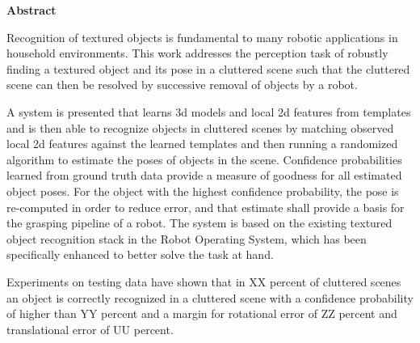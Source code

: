 

\clearemptydoublepage
{}
{}	





\vspace*{2cm}
\begin{center}
{\Large \bf Abstract}
\end{center}
\vspace{1cm}

Recognition of textured objects is fundamental to many robotic applications in
household environments. This work addresses the perception task of robustly
finding a textured object and its pose in a cluttered scene such that the
cluttered scene can then be resolved by successive removal of objects by a
robot.

A system is presented that learns 3d models and local 2d features from
templates and is then able to recognize objects in cluttered scenes by matching
observed local 2d features against the learned templates and then running a
randomized algorithm to estimate the poses of objects in the scene. Confidence
probabilities learned from ground truth data provide a measure of goodness for
all estimated object poses. For the object with the highest confidence
probability, the pose is re-computed in order to reduce error, and that
estimate shall provide a basis for the grasping pipeline of a robot. The system
is based on the existing textured object recognition stack in the Robot
Operating System, which has been specifically enhanced to better solve the task
at hand.

Experiments on testing data have shown that in XX percent of cluttered scenes
an object is correctly recognized in a cluttered scene with a confidence
probability of higher than YY percent and a margin for rotational error of ZZ
percent and translational error of UU percent.

